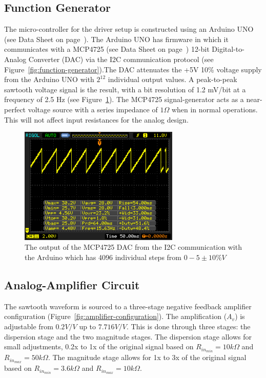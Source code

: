 \documentclass[12pt,journal]{IEEEtran}
\begin{document}
\subsection{Function Generator}
The micro-controller for the driver setup is constructed using an Arduino UNO (see Data Sheet on page~\pageref{datasheet:arduino_uno}). The Arduino UNO has firmware in which it communicates with a MCP4725 (see Data Sheet on page~\pageref{datasheet:mcp4725}) 12-bit Digital-to-Analog Converter (DAC) via the I2C communication protocol (see Figure~\ref{fig:function-generator}).The DAC attenuates the +5V 10\% voltage supply from the Arduino UNO with $2^12$ individual output values. A peak-to-peak sawtooth voltage signal is the result, with a bit resolution of 1.2 mV/bit at a frequency of 2.5 Hz (see Figure~\ref{fig:five-volts-15-hz-wave}). The MCP4725 signal-generator acts as a near-perfect voltage source with a series impedance of $1\Omega$ when in normal operations. This will not affect input resistances for the analog design.  

\begin{figure}[h!]
  \centering
	\includegraphics[width=3in]{./data/dac-output-waveform.png}
	\caption[Cavity Mounts]{The output of the MCP4725 DAC from the I2C communication with the Arduino which has 4096 individual steps from $0-5 \pm 10\% V$}
	\label{fig:five-volts-15-hz-wave}
\end{figure}

\subsection{Analog-Amplifier Circuit}

The sawtooth waveform is sourced to a three-stage negative feedback amplifier configuration (Figure~\ref{fig:amplifier-configuration}). The amplification ($A_v$) is adjustable from $0.2 V/V$ up to $7.716 V/V$. This is done through three stages: the dispersion stage and the two magnitude stages. The dispersion stage allows for small adjustments, 0.2x to 1x of the original signal based on $R_{in_{min}} = 10k\Omega$ and $R_{in_{max}} = 50k\Omega$. The magnitude stage allows for 1x to 3x of the original signal based on  $R_{in_{min}} = 3.6k\Omega$ and $R_{in_{max}} = 10k\Omega$. 
\end{document}
